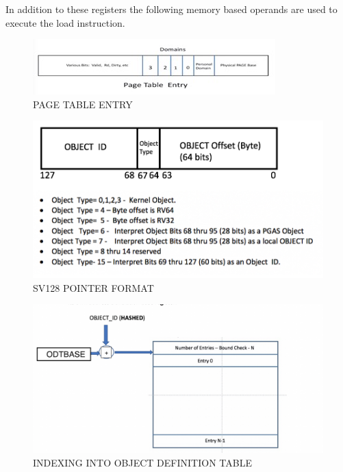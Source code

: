 \documentclass{article}
\begin{document}
\begin{appendices}
\begin {itemize}
\end{itemize}





\pagebreak

In addition to these registers the following memory based operands are used to execute the load instruction.  



\begin{figure}[h]
\includegraphics[scale= 1.2]{figures/figure2b_pte.jpg}
\caption{PAGE TABLE ENTRY\label{PAGE TBALE EnTRY}}
\end{figure}
\begin{figure}[h]

\includegraphics[scale= .5]{figures/pointer_96_bit_object_type_field.jpg}
\begin{center}
\caption{SV128 POINTER FORMAT \label{SV128 POINTER FORMAT}}
\end{center}
\end{figure}

\begin{figure}[h]
\includegraphics[scale= .3]{figures/figure4a_datt_translation_table.jpg}
\caption{INDEXING INTO OBJECT DEFINITION TABLE} \label{INDEXING INTO OBJECT DEFINITION TABLE}


\end{figure}
\end{appendices}
\end{document}
